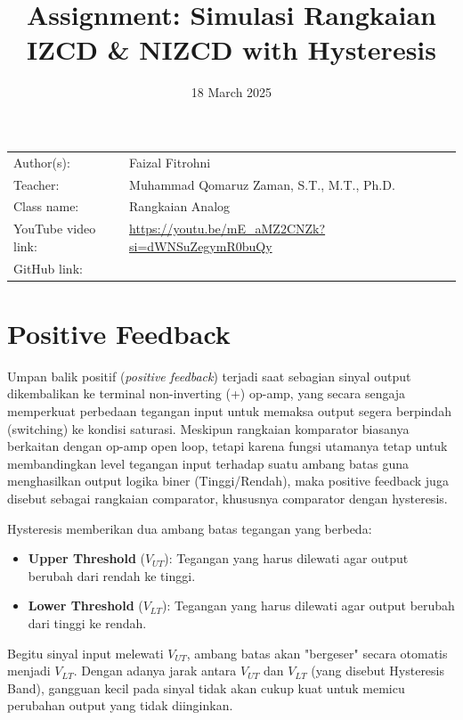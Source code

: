 \documentclass{article}
\title{Assignment: Simulasi Rangkaian IZCD \& NIZCD with Hysteresis
}
\date{18 March 2025}
\begin{document}
\maketitle

\noindent\begin{tabular}{@{}ll}
    Author(s): & Faizal Fitrohni\\
     Teacher: &  Muhammad Qomaruz Zaman, S.T., M.T., Ph.D.\\
     Class name: & Rangkaian Analog\\
     YouTube video link: & \url{https://youtu.be/mE_aMZ2CNZk?si=dWNSuZegymR0buQy} \\
     GitHub link: & \url{}
\end{tabular}
\vspace{2cm}

\section*{Positive Feedback}

Umpan balik positif (\textit{positive feedback}) terjadi saat sebagian sinyal output dikembalikan ke terminal non-inverting (+) op-amp, yang secara sengaja memperkuat perbedaan tegangan input untuk memaksa output segera berpindah (switching) ke kondisi saturasi. Meskipun rangkaian komparator biasanya berkaitan dengan op-amp open loop, tetapi karena fungsi utamanya tetap untuk membandingkan level tegangan input terhadap suatu ambang batas guna menghasilkan output logika biner (Tinggi/Rendah), maka positive feedback juga disebut sebagai rangkaian comparator, khususnya comparator dengan hysteresis.

Hysteresis memberikan dua ambang batas tegangan yang berbeda:

\begin{itemize}
    \item \textbf{Upper Threshold} ($V_{UT}$): Tegangan yang harus dilewati agar output berubah dari rendah ke tinggi.
    \item \textbf{Lower Threshold} ($V_{LT}$): Tegangan yang harus dilewati agar output berubah dari tinggi ke rendah.
\end{itemize}

Begitu sinyal input melewati $V_{UT}$, ambang batas akan "bergeser" secara otomatis menjadi $V_{LT}$. Dengan adanya jarak antara $V_{UT}$ dan $V_{LT}$ (yang disebut Hysteresis Band), gangguan kecil pada sinyal tidak akan cukup kuat untuk memicu perubahan output yang tidak diinginkan.
\end{document}
